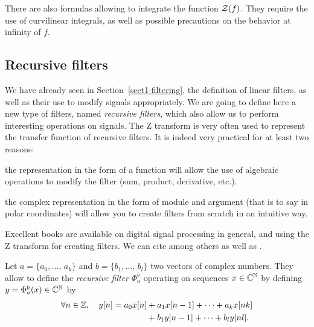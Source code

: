  
\begin{rem}
There are also formulas allowing to integrate the function $ \mathcal{Z} (f) $. They require the use of curvilinear integrals, as well as possible precautions on the behavior at infinity of $ f $.
\end{rem}
 
\subsection{Recursive filters}
\label{sect2-application-trans-z-filters} 
 
 
We have already seen in Section~\ref{sect1-filtering}, the definition of linear filters, as well as their use to modify signals appropriately. We are going to define here a new type of filters, named \textit{recursive filters}, which also allow us to perform interesting operations on signals. The Z transform is very often used to represent the transfer function of recursive filters. It is indeed very practical for at least two reasons: \begin{rs}
\item the representation in the form of a function will allow the use of algebraic operations to modify the filter (sum, product, derivative, etc.).
\item the complex representation in the form of module and argument (that is to say in polar coordinates) will allow you to create filters from scratch in an intuitive way.
\end{rs}
 
 
Excellent books are available on digital signal processing in general, and using the Z transform for creating filters. We can cite among others \cite{smith-segdps} as well as \cite{claerbout-fgdp}.
 
 
 
 
\begin{defn}
 \label{notation-61} Let $ a = \{a_0, \ldots, \, a_k \} $ and $ b = \{b_1, \ldots, \, b_l \} $ two vectors of complex numbers. They allow to define the \textit{recursive filter} $ \Phi_a^b $ operating on sequences $ x \in \mathbb{C}^{\mathbb{N}} $ by defining $ y = \Phi_a^b (x) \in \mathbb{C}^{\mathbb{N}} $ by
\begin{equation}
\label{eq-defn-recursive-filter}
\begin{split}
\forall n \in \mathbb{Z}, \quad y [n] = a_0 x [n] & + a_1 x [n-1] + \cdots + a_k x [nk] \\
& + b_1 y [n-1] + \cdots + b_l y [nl].
\end{split}
\end{equation}
\end{defn}
 
